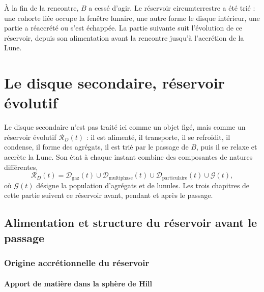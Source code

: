 \documentclass[11pt,a4paper,openany]{report}
\newcommand{\RD}{\mathcal{R}_{D}}
\begin{document}

\begin{rappel}
À la fin de la rencontre, $B$ a cessé d'agir. Le réservoir circumterrestre a été trié : une cohorte liée
occupe la fenêtre lunaire, une autre forme le disque intérieur, une partie a réaccrété ou s'est
échappée. La partie suivante suit l'évolution de ce réservoir, depuis son alimentation avant la
rencontre jusqu'à l'accrétion de la Lune.
\end{rappel}

\part{Le disque secondaire, réservoir évolutif}
\label{part:reservoir}

\noindent
Le disque secondaire n'est pas traité ici comme un objet figé, mais comme un réservoir
évolutif $\RD(t)$ : il est alimenté, il transporte, il se refroidit, il condense, il forme des agrégats,
il est trié par le passage de $B$, puis il se relaxe et accrète la Lune. Son état à chaque instant
combine des composantes de natures différentes,
\begin{equation}
\RD(t)=\mathcal{D}_{\mathrm{gaz}}(t)\cup\mathcal{D}_{\mathrm{multiphase}}(t)\cup
\mathcal{D}_{\mathrm{particulaire}}(t)\cup\mathcal{G}(t),
\label{eq:RD}
\end{equation}
où $\mathcal{G}(t)$ désigne la population d'agrégats et de lunules. Les trois chapitres de cette
partie suivent ce réservoir avant, pendant et après le passage.

\chapter{Alimentation et structure du réservoir avant le passage}
\label{ch:structure}

\section{Origine accrétionnelle du réservoir}
\subsection{Apport de matière dans la sphère de Hill}
\end{document}
